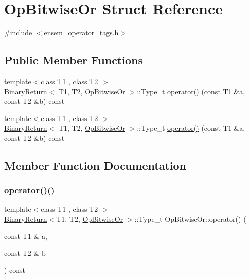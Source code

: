 \hypertarget{structOpBitwiseOr}{}\section{Op\+Bitwise\+Or Struct Reference}
\label{structOpBitwiseOr}


{\ttfamily \#include $<$ensem\+\_\+operator\+\_\+tags.\+h$>$}

\subsection*{Public Member Functions}
\begin{DoxyCompactItemize}
\item 
{\footnotesize template$<$class T1 , class T2 $>$ }\\\mbox{\hyperlink{structBinaryReturn}{Binary\+Return}}$<$ T1, T2, \mbox{\hyperlink{structOpBitwiseOr}{Op\+Bitwise\+Or}} $>$\+::Type\+\_\+t \mbox{\hyperlink{structOpBitwiseOr_a05a68ce8b7a79808447ed381afb810be}{operator()}} (const T1 \&a, const T2 \&b) const
\item 
{\footnotesize template$<$class T1 , class T2 $>$ }\\\mbox{\hyperlink{structBinaryReturn}{Binary\+Return}}$<$ T1, T2, \mbox{\hyperlink{structOpBitwiseOr}{Op\+Bitwise\+Or}} $>$\+::Type\+\_\+t \mbox{\hyperlink{structOpBitwiseOr_a05a68ce8b7a79808447ed381afb810be}{operator()}} (const T1 \&a, const T2 \&b) const
\end{DoxyCompactItemize}


\subsection{Member Function Documentation}
\mbox{\label{structOpBitwiseOr_a05a68ce8b7a79808447ed381afb810be}} 
\subsubsection{\texorpdfstring{operator()()}{operator()()}\hspace{0.1cm}{\footnotesize\ttfamily [1/2]}}
{\footnotesize\ttfamily template$<$class T1 , class T2 $>$ \\
\mbox{\hyperlink{structBinaryReturn}{Binary\+Return}}$<$T1, T2, \mbox{\hyperlink{structOpBitwiseOr}{Op\+Bitwise\+Or}} $>$\+::Type\+\_\+t Op\+Bitwise\+Or\+::operator() (\begin{DoxyParamCaption}\item[{const T1 \&}]{a,  }\item[{const T2 \&}]{b }\end{DoxyParamCaption}) const\hspace{0.3cm}{\ttfamily [inline]}}

